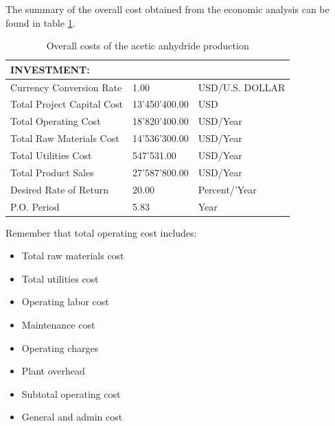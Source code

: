 \begin{enumerate}[label=\textbf{Step \arabic{enumi}}:,ref=Step \arabic{enumi}]
	The summary of the overall cost obtained from the economic analysis can be found in table \ref{tab:AceticProdInvestment}.
	
	\begin{table}[h!]
		\centering
		\begin{tabular}{l|ll}
			INVESTMENT:                &  \\ \hline
			Currency Conversion Rate   & 1.00                                               & USD/U.S. DOLLAR                                        \\
			Total Project Capital Cost & 13'450'400.00                                        & USD                                                    \\
			Total Operating Cost       & 18'820'400.00                                        & USD/Year                                               \\
			Total Raw Materials Cost   & 14'536'300.00                                        & USD/Year                                               \\
			Total Utilities Cost       & 547'531.00                                          & USD/Year                                               \\
			Total Product Sales        & 27'587'800.00                                        & USD/Year                                               \\
			Desired Rate of Return     & 20.00                                              & Percent/'Year                                          \\
			P.O. Period                & 5.83                                               & Year            \\ \hline                                      
		\end{tabular}
	\caption{Overall costs of the acetic anhydride production}
	\label{tab:AceticProdInvestment}
	\end{table}

	Remember that total operating cost includes:
	
	\begin{multicols}{2}
		\begin{itemize}
			\item Total raw materials cost
			\item Total utilities cost
			\item Operating labor cost
			\item Maintenance cost
			\item Operating charges
			\item Plant overhead
			\item Subtotal operating cost
			\item General and admin cost
		\end{itemize} 
	\end{multicols}
	
	\end{enumerate}
	
